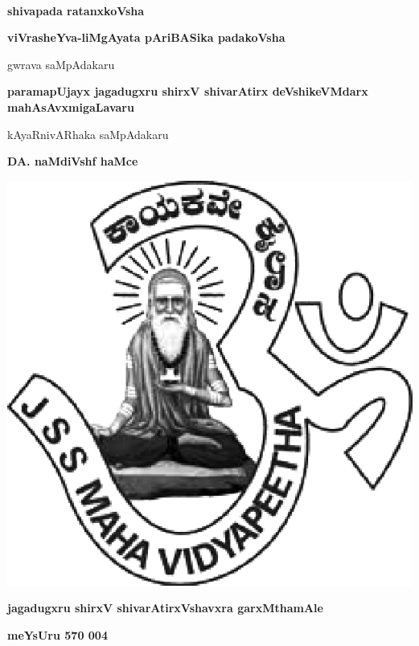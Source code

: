 ~\thispagestyle{empty}

\vfill

\begin{center}
{\fontsize{50}{50}\selectfont\bfseries shivapada ratanxkoVsha}\relax

\medskip

{\LARGE\bfseries viVrasheYva-liMgAyata pAriBASika padakoVsha}
\end{center}

\vfill


\begin{center}
{gwrava saMpAdakaru}

\medskip

{\large\bf paramapUjayx jagadugxru shirxV shivarAtirx deVshikeVMdarx mahAsAvxmigaLavaru}

\bigskip
\bigskip

{kAyaRnivARhaka saMpAdakaru}

\medskip

{\large\bf DA. naMdiVshf haMce}

\end{center}

\vfill


\centerline{\includegraphics[scale=.3]{JSSlogo.eps}}

\medskip

\centerline{\large\bfseries jagadugxru shirxV shivarAtirxVshavxra  garxMthamAle}

\smallskip

\centerline{\large\bfseries meYsUru  570 004}

